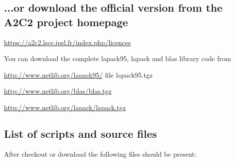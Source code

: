 \documentclass[11p,a4paper]{article}
\begin{document}
%
%
\subsection{...or download the official version from the A2C2 project homepage}

\href{https://a2c2.lsce.ipsl.fr/index.php/licences}{https://a2c2.lsce.ipsl.fr/index.php/licences}

You can download the complete lapack95, lapack and blas library code from 

\href{http://www.netlib.org/lapack95/}{http://www.netlib.org/lapack95/} file lapack95.tgz

\href{http://www.netlib.org/blas/blas.tgz}{http://www.netlib.org/blas/blas.tgz} 

\href{http://www.netlib.org/lapack/lapack.tgz}{http://www.netlib.org/lapack/lapack.tgz}

\subsection{List of scripts and source files}
\label{sec:listoffiles}
After checkout or download the following files should be present:
\end{document}
